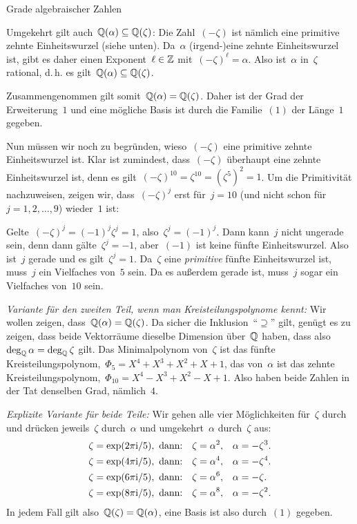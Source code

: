 \documentclass{algblatt}
\begin{document}
\begin{aufgabe}{Grade algebraischer Zahlen}
\begin{loesungE}
Umgekehrt gilt auch~$\mathbb{Q}(\alpha) \subseteq \mathbb{Q}(\zeta)$: Die Zahl~$(-\zeta)$ ist
nämlich eine primitive zehnte Einheitswurzel (siehe unten). Da~$\alpha$
(irgend-)eine zehnte Einheitswurzel ist, gibt es daher einen Exponent~$\ell
\in \mathbb{Z}$ mit~$(-\zeta)^\ell = \alpha$. Also ist~$\alpha$ in~$\zeta$ rational,
d.\,h. es gilt~$\mathbb{Q}(\alpha) \subseteq \mathbb{Q}(\zeta)$.

Zusammengenommen gilt somit~$\mathbb{Q}(\alpha) = \mathbb{Q}(\zeta)$. Daher ist der Grad der
Erweiterung~$1$ und eine mögliche Basis ist durch die Familie~$(1)$ der
Länge~$1$ gegeben.

Nun müssen wir noch zu begründen, wieso~$(-\zeta)$ eine primitive zehnte Einheitswurzel
ist. Klar ist zumindest, dass~$(-\zeta)$ überhaupt eine zehnte Einheitswurzel
ist, denn es gilt~$(-\zeta)^{10} = \zeta^{10} = (\zeta^5)^2 = 1$. Um die
Primitivität nachzuweisen, zeigen wir, dass~$(-\zeta)^j$ erst für~$j = 10$ (und
nicht schon für~$j = 1,2,\ldots,9$) wieder~$1$ ist:

Gelte~$(-\zeta)^j = (-1)^j \zeta^j = 1$, also~$\zeta^j = (-1)^j$. Dann kann~$j$
nicht ungerade sein, denn dann gälte~$\zeta^j = -1$, aber~$(-1)$ ist keine
fünfte Einheitswurzel. Also ist~$j$ gerade und es gilt~$\zeta^j = 1$. Da~$\zeta$ eine
\emph{primitive} fünfte Einheitswurzel ist, muss~$j$ ein Vielfaches von~$5$
sein. Da es außerdem gerade ist, muss~$j$ sogar ein Vielfaches von~$10$ sein.

\emph{Variante für den zweiten Teil, wenn man Kreisteilungspolynome kennt:} Wir wollen
zeigen, dass~$\mathbb{Q}(\alpha) = \mathbb{Q}(\zeta)$. Da sicher die
Inklusion~"`$\supseteq$"' gilt, genügt es zu zeigen, dass beide Vektorräume
dieselbe Dimension über~$\mathbb{Q}$ haben, dass also~$\deg_{\mathbb{Q}} \alpha = \deg_{\mathbb{Q}}
\zeta$ gilt. Das Minimalpolynom von~$\zeta$ ist das fünfte
Kreisteilungspolynom,~$\Phi_5 = X^4 + X^3 + X^2 + X + 1$, das von~$\alpha$ ist
das zehnte Kreisteilungspolynom,~$\Phi_{10} = X^4 - X^3 + X^2 - X + 1$. Also
haben beide Zahlen in der Tat denselben Grad, nämlich~$4$.

\emph{Explizite Variante für beide Teile:} Wir gehen alle vier Möglichkeiten
für~$\zeta$ durch und drücken jeweils~$\zeta$ durch~$\alpha$ und
umgekehrt~$\alpha$ durch~$\zeta$ aus:
\begin{align*}
  \zeta &= \exp(2\pi\mathrm{i}/5), \text{ dann:} & \zeta &= \alpha^2, & \alpha &= -\zeta^3. \\
  \zeta &= \exp(4\pi\mathrm{i}/5), \text{ dann:} & \zeta &= \alpha^4, & \alpha &= -\zeta^4. \\
  \zeta &= \exp(6\pi\mathrm{i}/5), \text{ dann:} & \zeta &= \alpha^6, & \alpha &= -\zeta. \\
  \zeta &= \exp(8\pi\mathrm{i}/5), \text{ dann:} & \zeta &= \alpha^8, & \alpha &= -\zeta^2.
\end{align*}
In jedem Fall gilt also~$\mathbb{Q}(\zeta) = \mathbb{Q}(\alpha)$, eine Basis ist also durch~$(1)$
gegeben.
\end{loesungE}
\end{aufgabe}
\end{document}
